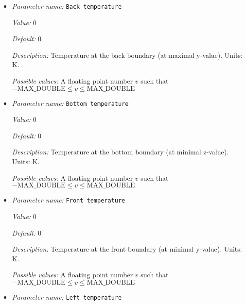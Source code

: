 \begin{itemize}
\item {\it Parameter name:} {\tt Back temperature}
\label{parameters:Boundary temperature model/Box/Back temperature}
\label{parameters:Boundary_20temperature_20model/Box/Back_20temperature}


{\it Value:} 0


{\it Default:} 0


{\it Description:} Temperature at the back boundary (at maximal y-value). Units: K.


{\it Possible values:} A floating point number $v$ such that $-\text{MAX\_DOUBLE} \leq v \leq \text{MAX\_DOUBLE}$
\item {\it Parameter name:} {\tt Bottom temperature}
\label{parameters:Boundary temperature model/Box/Bottom temperature}
\label{parameters:Boundary_20temperature_20model/Box/Bottom_20temperature}


{\it Value:} 0


{\it Default:} 0


{\it Description:} Temperature at the bottom boundary (at minimal z-value). Units: K.


{\it Possible values:} A floating point number $v$ such that $-\text{MAX\_DOUBLE} \leq v \leq \text{MAX\_DOUBLE}$
\item {\it Parameter name:} {\tt Front temperature}
\label{parameters:Boundary temperature model/Box/Front temperature}
\label{parameters:Boundary_20temperature_20model/Box/Front_20temperature}


{\it Value:} 0


{\it Default:} 0


{\it Description:} Temperature at the front boundary (at minimal y-value). Units: K.


{\it Possible values:} A floating point number $v$ such that $-\text{MAX\_DOUBLE} \leq v \leq \text{MAX\_DOUBLE}$
\item {\it Parameter name:} {\tt Left temperature}
\label{parameters:Boundary temperature model/Box/Left temperature}
\label{parameters:Boundary_20temperature_20model/Box/Left_20temperature}



\end{itemize}
